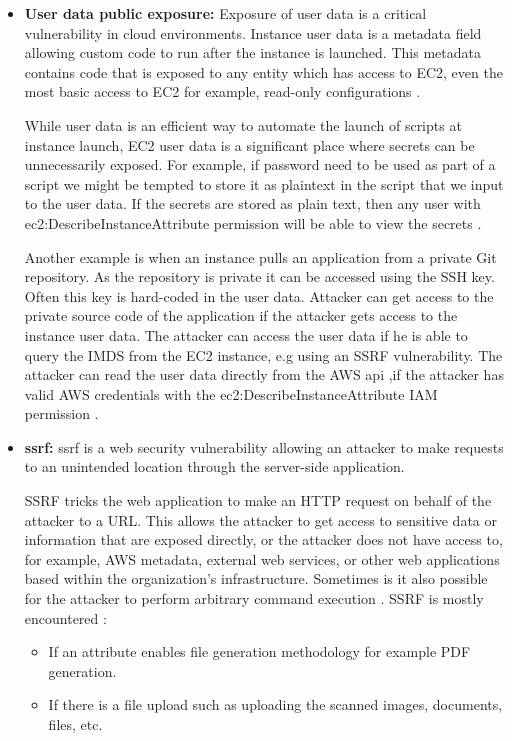 \begin{itemize}
    \item \textbf{User data public exposure:} Exposure of user data is a critical vulnerability in cloud environments.
    Instance user data is a metadata field allowing custom code to run after the instance is launched.
    This metadata
    contains code that is exposed to any entity which has access to EC2, even the most basic access to EC2 for
    example, read-only configurations \cite{49}.

    While user data is an efficient way to automate the launch of scripts at instance launch, EC2 user data is a
    significant place where secrets can be unnecessarily exposed.
    For example, if password need to be used as part of
    a script we might be tempted to store it as plaintext in the script that we input to the user data.
    If the secrets are stored as plain text, then any user with ec2:DescribeInstanceAttribute permission will be able to view the secrets \cite{50}.

    Another example is when an instance pulls an application from a private Git repository.
    As the repository is
    private it can be accessed using the SSH key.
    Often this key is hard-coded in the user data.
    Attacker can get
    access to the private source code of the application if the attacker gets access to the instance user data.
    The attacker can access the user data if he is able to query the IMDS from the EC2 instance, e.g using an SSRF
    vulnerability.
    The attacker can read the user data directly from the
    AWS \gls{api} ,if the attacker has valid AWS
    credentials with the ec2:DescribeInstanceAttribute IAM permission \cite{51}.
\end{itemize}

\begin{itemize}
    \item \textbf{\gls{ssrf}:} \gls{ssrf} is a web security
    vulnerability allowing an attacker to make requests to an unintended location through the server-side application.

    SSRF tricks the web application to make an HTTP request on behalf of the attacker to a URL. This allows the
    attacker to get access to sensitive data or information that are exposed directly, or the attacker does not have
    access to, for example, AWS metadata, external web services, or other web applications based within the
    organization’s infrastructure.
    Sometimes is it also possible for the attacker to perform arbitrary command
    execution \cite{52}.
    SSRF is mostly encountered \cite{53}:
    \begin{itemize}
        \item If an attribute enables file generation methodology for example PDF generation.
    \end{itemize}
    \begin{itemize}
        \item If there is a file upload such as uploading the scanned images, documents, files, etc.
    \end{itemize}
\end{itemize}

